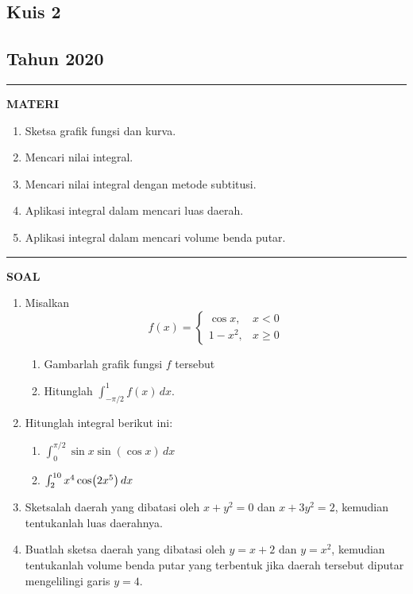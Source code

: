 \begin{flushright}
    \section*{\Large{Kuis 2}}
    \subsection*{Tahun 2020}
\end{flushright}
\vspace{0.5cm}
\hrule height 2pt
\vspace{0.5cm}
\begin{center}
    \textbf{\large{MATERI}}
    \begin{enumerate}[leftmargin=*, label={\arabic*}.]
        \item Sketsa grafik fungsi dan kurva.
        \item Mencari nilai integral.
        \item Mencari nilai integral dengan metode subtitusi.
        \item Aplikasi integral dalam mencari luas daerah.
        \item Aplikasi integral dalam mencari volume benda putar.
    \end{enumerate}
\end{center}
\vspace{0.2cm}
\hrule height 1pt
\vspace{0.5cm}
\begin{center}
    \textbf{\large{SOAL}}
\end{center}
\begin{enumerate}[leftmargin=*, label={\arabic*}.]
\item Misalkan
\[
f(x) = 
\begin{cases}
    \cos x, & x < 0\\
    1-x^{2}, &x \geq 0
\end{cases}
\]
\begin{enumerate}[label={\alph*}.]
    \item Gambarlah grafik fungsi $f$ tersebut
    \item Hitunglah $\int_{-\pi/2}^{1}f(x)\,dx$.
\end{enumerate}
\item Hitunglah integral berikut ini:
    \begin{enumerate}[label={\alph*}.]
        \item $\int_{0}^{\pi/2} \sin x \sin(\cos x) \,dx$
        \item $\int_{2}^{10} x^{4}\cos\brk*{2x^5}\,dx$
    \end{enumerate}
\item Sketsalah daerah yang dibatasi oleh $x+y^2=0$ dan $x+3y^{2}=2$, 
kemudian tentukanlah luas daerahnya.
\item Buatlah sketsa daerah yang dibatasi oleh $y=x+2$ dan $y=x^{2}$, 
kemudian tentukanlah volume benda putar yang terbentuk jika daerah 
tersebut diputar mengelilingi garis $y=4$.
\end{enumerate}
